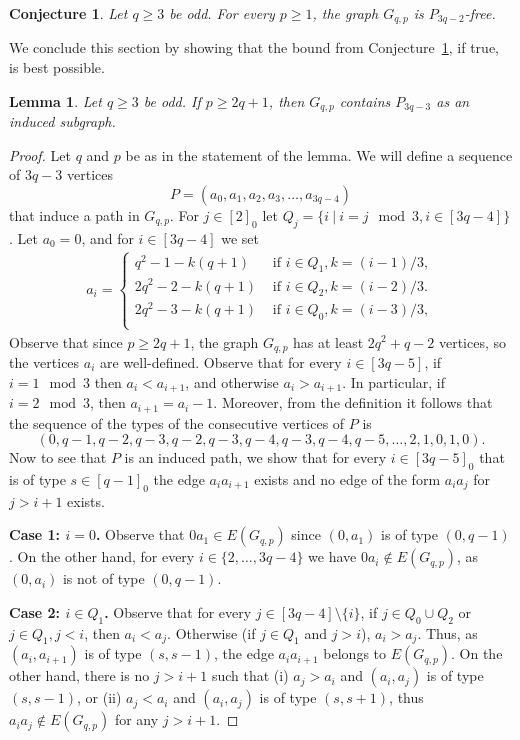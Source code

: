 \documentclass[11pt,a4paper]{article}
\theoremstyle{mystyle}
\newtheorem{lemma}[theorem]{Lemma}
\newtheorem{conjecture}[theorem]{Conjecture}
\begin{document}
\begin{conjecture}\label{con:path}
    Let $q \geq 3$ be odd. For every $p \geq 1$, the graph $G_{q,p}$ is $P_{3q-2}$-free. 
\end{conjecture}


We conclude this section by showing that the bound from Conjecture~\ref{con:path}, if true, is best possible.

\begin{lemma}\label{lem:lowerpath}
Let $q \geq 3$ be odd. If $p \geq 2q+1$, then $G_{q,p}$ contains $P_{3q-3}$ as an induced subgraph.
\end{lemma}
\begin{proof}
Let $q$ and $p$ be as in the statement of the lemma.
We will define a sequence of $3q-3$ vertices \[P=(a_0,a_1,a_2,a_3,\ldots,a_{3q-4})\] that induce a path in $G_{q,p}$.
For $j \in [2]_0$ let $Q_j=\{i~|~i = j \mod 3, i \in [3q-4]\}$. 
Let $a_0=0$, and for $i \in [3q-4]$ we set
\begin{align*}
    a_i=\begin{cases}
        q^2-1 - k(q+1) & \textrm{ if }i \in Q_1, k=(i-1)/3, \\
        2q^2-2-k(q+1) & \textrm{ if }i \in Q_2, k=(i-2)/3. \\
        2q^2-3-k(q+1) & \textrm{ if }i \in Q_0, k=(i-3)/3, \\
    \end{cases}
\end{align*}
Observe that since $p\geq 2q+1$, the graph $G_{q,p}$ has at least $2q^2+q-2$ vertices, so the vertices $a_i$ are well-defined. Observe that for every $i \in [3q-5]$, if $i = 1 \mod 3$ then $a_i < a_{i+1}$, and otherwise $a_i > a_{i+1}$. In particular, if $i = 2 \mod 3$, then $a_{i+1}=a_i-1$.
Moreover, from the definition it follows that the sequence of the types of the consecutive vertices of $P$ is \[(0,q-1,q-2,q-3,q-2,q-3,q-4,q-3,q-4,q-5,\ldots,2,1,0,1,0).\]
Now to see that $P$ is an induced path, we show that for every $i \in [3q-5]_0$ that is of type $s \in [q-1]_0$ the edge $a_ia_{i+1}$ exists and no edge of the form $a_ia_j$ for $j>i+1$ exists.

\smallskip
\noindent\textbf{\boldmath Case 1: $i=0$.} Observe that $0a_1\in E(G_{q,p})$ since $(0,a_1)$ is of type $(0,q-1)$. On the other hand, for every $i \in \{2,\ldots, 3q-4\}$ we have $0a_i \notin E(G_{q,p})$, as $(0,a_i)$ is not of type $(0,q-1)$. 

\smallskip
\noindent\textbf{\boldmath Case 2: $i \in Q_1$.} Observe that for every $j \in [3q-4] \setminus \{i\}$, if $j \in Q_0 \cup Q_2$ or $j \in Q_1, j<i$, then $a_i < a_j$. Otherwise (if $j \in Q_1$ and $j>i$), $a_i>a_j$. Thus, as $(a_i,a_{i+1})$ is of type $(s,s-1)$, the edge $a_ia_{i+1}$ belongs to $E(G_{q,p})$. On the other hand, there is no $j >i+1$ such that (i) $a_j>a_i$ and $(a_i,a_j)$ is of type $(s,s-1)$, or (ii) $a_j<a_i$ and $(a_i,a_j)$ is of type $(s,s+1)$, thus $a_ia_j \notin E(G_{q,p})$ for any $j >i+1$.


\end{proof}
\end{document}
